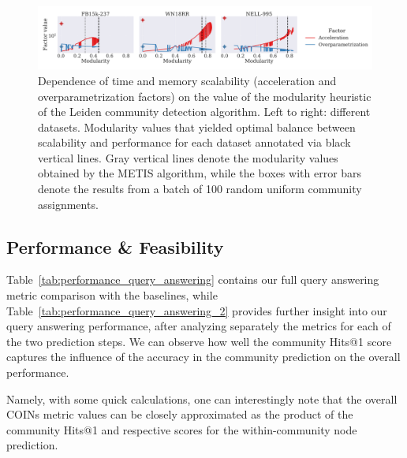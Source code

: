 \begin{figure}[H]
\begin{center}
\includegraphics[width=\textwidth]{figures/coins/scalability_leiden_modularity}
\end{center}
\caption[Dependence of time and memory scalability on the value of the modularity heuristic of the Leiden community detection algorithm.]{Dependence of time and memory scalability (acceleration and overparametrization factors) on the value of the modularity heuristic of the Leiden community detection algorithm. Left to right: different datasets. Modularity values that yielded optimal balance between scalability and performance for each dataset annotated via black vertical lines. Gray vertical lines denote the modularity values obtained by the METIS algorithm, while the boxes with error bars denote the results from a batch of 100 random uniform community assignments.}
\label{fig:scalability_modularity}
\end{figure}

\subsection{Performance \& Feasibility}

Table~\ref{tab:performance_query_answering} contains our full query answering metric comparison with the baselines, while Table~\ref{tab:performance_query_answering_2} provides further insight into our query answering performance, after analyzing separately the metrics for each of the two prediction steps. We can observe how well the community Hits@1 score captures the influence of the accuracy in the community prediction on the overall performance. 

Namely, with some quick calculations, one can interestingly note that the overall COINs metric values can be closely approximated as the product of the community Hits@1 and respective scores for the within-community node prediction.

